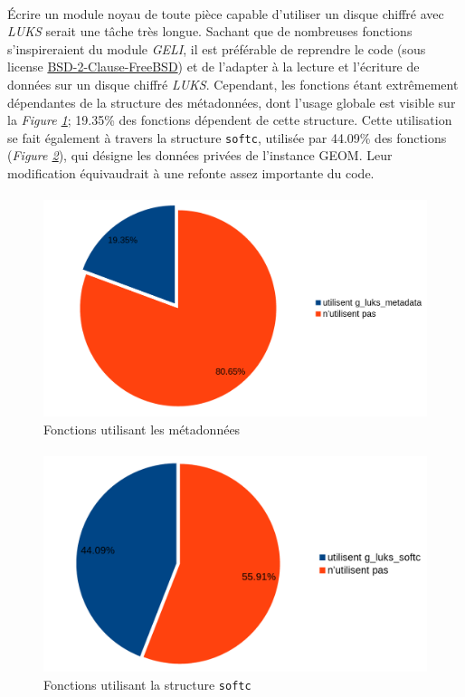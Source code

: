 \paragraph{}
Écrire un module noyau de toute pièce capable d'utiliser un disque chiffré avec
\textit{LUKS} serait une tâche très longue. Sachant que de nombreuses fonctions
s'inspireraient du module \textit{GELI}, il est préférable de reprendre le code
(sous license \underline{BSD-2-Clause-FreeBSD}) et de l'adapter à la lecture et
l'écriture de données sur un disque chiffré \textit{LUKS}. Cependant, les
fonctions étant extrêmement dépendantes de la structure des métadonnées, dont
l'usage globale est visible sur la \textit{Figure \ref{fig:fonctions_md}};
19.35\% des fonctions dépendent de cette structure. Cette utilisation se fait
également à travers la structure \texttt{softc}, utilisée par 44.09\% des
fonctions (\textit{Figure \ref{fig:fonctions_sc}}), qui désigne les données
privées de l'instance GEOM. Leur modification équivaudrait à une refonte assez
importante du code.
\paragraph{}
\begin{figure}[h]
\centering
\includegraphics[width=.9\linewidth]{choix_developpement/fonctions_g_luks_metadata.png}
\caption{\label{fig:fonctions_md}Fonctions utilisant les métadonnées}
\end{figure}
\paragraph{}
\begin{figure}[h]
\centering
\includegraphics[width=.9\linewidth]{choix_developpement/fonctions_g_luks_softc.png}
\caption{\label{fig:fonctions_sc}Fonctions utilisant la structure \texttt{softc}}
\end{figure}
